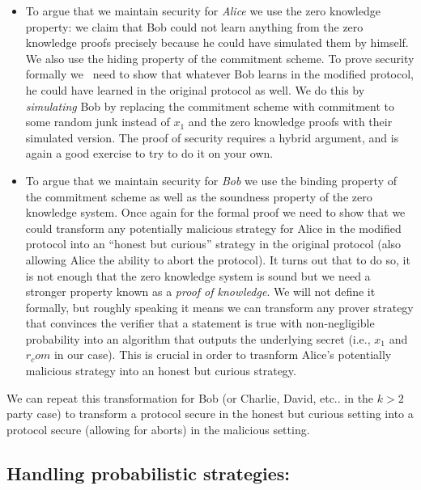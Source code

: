 \begin{itemize}
\item
  To argue that we maintain security for \emph{Alice} we use the zero
  knowledge property: we claim that Bob could not learn anything from
  the zero knowledge proofs precisely because he could have simulated
  them by himself. We also use the hiding property of the commitment
  scheme. To prove security formally we ~need to show that whatever Bob
  learns in the modified protocol, he could have learned in the original
  protocol as well. We do this by \emph{simulating} Bob by replacing the
  commitment scheme with commitment to some random junk instead of
  \(x_1\) and the zero knowledge proofs with their simulated version.
  The proof of security requires a hybrid argument, and is again a good
  exercise to try to do it on your own.
\item
  To argue that we maintain security for \emph{Bob} we use the binding
  property of the commitment scheme as well as the soundness property of
  the zero knowledge system. Once again for the formal proof we need to
  show that we could transform any potentially malicious strategy for
  Alice in the modified protocol into an ``honest but curious'' strategy
  in the original protocol (also allowing Alice the ability to abort the
  protocol). It turns out that to do so, it is not enough that the zero
  knowledge system is sound but we need a stronger property known as a
  \emph{proof of knowledge}. We will not define it formally, but roughly
  speaking it means we can transform any prover strategy that convinces
  the verifier that a statement is true with non-negligible probability
  into an algorithm that outputs the underlying secret (i.e., \(x_1\)
  and \(r_com\) in our case). This is crucial in order to trasnform
  Alice's potentially malicious strategy into an honest but curious
  strategy.
\end{itemize}

We can repeat this transformation for Bob (or Charlie, David, etc.. in
the \(k>2\) party case) to transform a protocol secure in the honest but
curious setting into a protocol secure (allowing for aborts) in the
malicious setting.

\subsection{Handling probabilistic
strategies:}\label{Handling-probabilistic-strateg}

